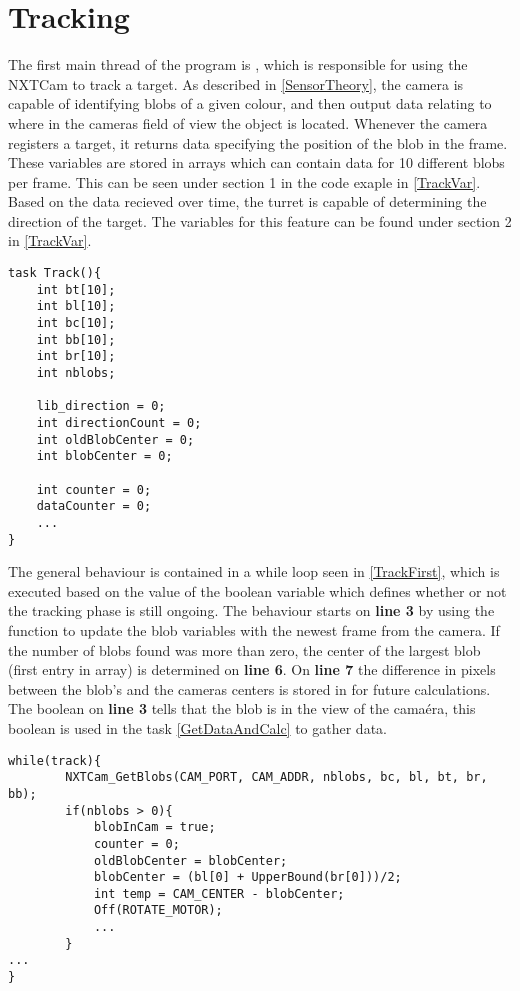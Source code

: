 \section{Tracking}
The first main thread of the program is , which is responsible
for using the NXTCam to track a target. As described in \autoref{SensorTheory}, the camera
is capable of identifying blobs of a given colour, and then output data relating to where
in the cameras field of view the object is located. Whenever the camera
registers a target, it returns data specifying the position of the blob in the
frame. These variables are stored in arrays which can contain data for 10
different blobs per frame. This can be seen under section 1 in the code exaple
in \autoref{TrackVar}. Based on the data recieved over time, the turret is
capable of determining the direction of the target. The variables
for this feature can be found under section 2 in \autoref{TrackVar}.\nl
 
\begin{minipage}[H]{\linewidth}
\begin{lstlisting}[caption = Variables used on the Track() thread., label = TrackVar, style = nc] 
task Track(){
    int bt[10];
    int bl[10];
    int bc[10];
    int bb[10];
    int br[10];
    int nblobs;

    lib_direction = 0;
    int directionCount = 0;
    int oldBlobCenter = 0;
    int blobCenter = 0;

    int counter = 0;
    dataCounter = 0;
    ...
}
\end{lstlisting}
\end{minipage}

The general behaviour is contained in a while loop seen in \autoref{TrackFirst},
which is executed based on the value of the boolean variable
 which defines whether or not the tracking phase is still
ongoing. The behaviour starts on \textbf{line 3} by using the
 function to update the blob variables with
the newest frame from the camera. If the number of blobs found was more than
zero, the center of the largest blob (first entry in array) is determined on
\textbf{line 6}. On \textbf{line 7} the difference in pixels between the blob's
and the cameras centers is stored in  for future
calculations. The boolean on \textbf{line 3} tells that the blob is in the
view of the camaéra, this boolean is used in the 
task \autoref{GetDataAndCalc} to gather data.\nl
  
\begin{minipage}[H]{\linewidth}
\begin{lstlisting}[caption = First part of the general tracking behaviour., label = TrackFirst] while(track){
        NXTCam_GetBlobs(CAM_PORT, CAM_ADDR, nblobs, bc, bl, bt, br, bb);
        if(nblobs > 0){
            blobInCam = true;
            counter = 0;
            oldBlobCenter = blobCenter;
            blobCenter = (bl[0] + UpperBound(br[0]))/2;
            int temp = CAM_CENTER - blobCenter;
            Off(ROTATE_MOTOR);
            ...
        }
...
}        
            
\end{lstlisting}
\end{minipage}

